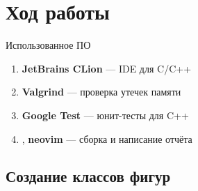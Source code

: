 \documentclass[a4paper, 14pt]{extarticle}
\begin{document}
\section{Ход работы}
Использованное ПО
\begin{enumerate}
    \item \textbf{JetBrains CLion} --- IDE для C/C++
    \item \textbf{Valgrind} --- проверка утечек памяти
    \item \textbf{Google Test} --- юнит-тесты для C++ 
    \item \XeLaTeX{}, \textbf{neovim} --- сборка и написание отчёта 
\end{enumerate}

\subsection{Создание классов фигур}
\end{document}
